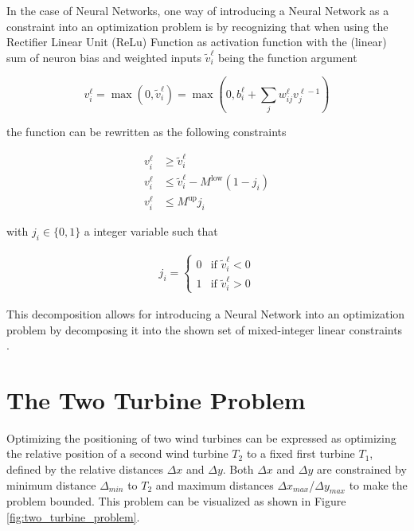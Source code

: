 In the case of Neural Networks, one way of introducing a Neural Network as a constraint into an optimization problem is by recognizing that when using the Rectifier Linear Unit (ReLu) Function as activation function with the (linear) sum of neuron bias and weighted inputs $\tilde{v}_i^\ell$ being the function argument


\begin{equation}
	v_i^\ell = \max(0, \tilde{v}_i^\ell) = \max(0,  b_i^\ell + \sum_j w_{ij}^\ell v_j^{\ell - 1})
\end{equation}


the function can be rewritten as the following constraints 

\begin{align}
	v_i^\ell &\geq \tilde{v}_i^\ell \\
	v_i^\ell &\leq \tilde{v}_i^\ell - M^{\text{low}}(1 - j_i) \\
	v_i^\ell &\leq M^{\text{up}} j_i
\end{align}

with $j_i \in \{0,1\}$ a integer variable such that

\begin{align}
	j_i =
	\begin{cases}
		0 & \text{if } \tilde{v}_i^\ell < 0 \\
		1 & \text{if } \tilde{v}_i^\ell > 0
	\end{cases}
\end{align}

This decomposition allows for introducing a Neural Network into an optimization problem by decomposing it into the shown set of mixed-integer linear constraints \cite{ALCANTARA2023120895}.

\section{The Two Turbine Problem}

Optimizing the positioning of two wind turbines can be expressed as optimizing the relative position of a second wind turbine $T_2$ to a fixed first turbine $T_1$, defined by the relative distances $\Delta x$ and  $\Delta y$. Both  $\Delta x$ and  $\Delta y$ are constrained by minimum distance $\Delta_{min}$ to  $T_2$ and maximum distances $\Delta x_{max}$/$\Delta y_{max}$ to make the problem bounded. 
This problem can be visualized as shown in Figure \ref{fig:two_turbine_problem}.

